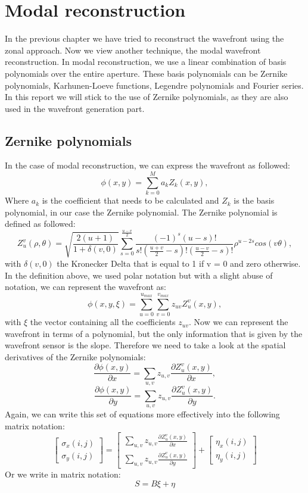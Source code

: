 \documentclass{article}
\begin{document}
\newpage
\section{Modal reconstruction}
In the previous chapter we have tried to reconstruct the wavefront using the zonal approach. Now we view another technique, the modal wavefront reconstruction. In modal reconstruction, we use a linear combination of basis polynomials over the entire aperture. These basis polynomials can be Zernike polynomials, Karhunen-Loeve functions, Legendre polynomials and Fourier series. In this report we will stick to the use of Zernike polynomials, as they are also used in the wavefront generation part. 

\subsection{Zernike polynomials}
In the case of modal reconstruction, we can express the wavefront as followed:
$$
\phi (x,y) = \sum_{k=0}^{M}a_kZ_k(x,y), 
$$
Where $a_k$ is the coefficient that needs to be calculated and $Z_k$ is the basis polynomial, in our case the Zernike polynomial. The Zernike polynomial is defined as followed:
$$
Z_u^v(\rho,\theta) = \sqrt{\frac{2(u+1)}{1+\delta(v,0)}}\sum_{s=0}^{\frac{u-v}{2}}\frac{(-1)^s(u-s)!}{s!(\frac{u+v}{2}-s)!(\frac{u-v}{2}-s)!}
\rho^{u-2s}cos(v\theta),
$$
with $\delta(v,0)$ the Kronecker Delta that is equal to 1 if v = 0 and zero otherwise. In the definition above, we used polar notation but with a slight abuse of notation, we can represent the wavefront as:
$$
\phi (x,y,\xi) = \sum_{u=0}^{u_{max}}\sum_{v=0}^{v_{max}}z_{uv}Z_u^v(x,y),
$$
with $\xi$ the vector containing all the coefficients $z_{uv}$.
Now we can represent the wavefront in terms of a polynomial, but the only information that is given by the wavefront sensor is the slope. Therefore we need to take a look at the spatial derivatives of the Zernike polynomials:
$$
\frac{\partial \phi(x,y)}{\partial x} = \sum_{u,v}z_{u,v}\frac{\partial Z_u^v(x,y)}{\partial x},
$$
$$
\frac{\partial \phi(x,y)}{\partial y} = \sum_{u,v}z_{u,v}\frac{\partial Z_u^v(x,y)}{\partial y}.
$$
Again, we can write this set of equations more effectively into the following matrix notation:
$$
\begin{bmatrix}
\sigma_x(i,j) \\
\sigma_y(i,j)
\end{bmatrix}
=
\begin{bmatrix}
\sum_{u,v}z_{u,v}\frac{\partial Z_u^v(x,y)}{\partial x} \\
\sum_{u,v}z_{u,v}\frac{\partial Z_u^v(x,y)}{\partial y}
\end{bmatrix}
+
\begin{bmatrix}
\eta_x(i,j) \\
\eta_y(i,j)
\end{bmatrix}
$$
Or we write in matrix notation:
$$
S = B\xi + \eta
$$
\end{document}
